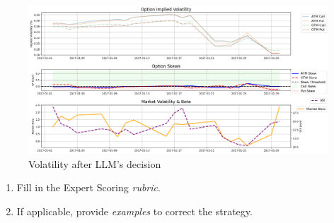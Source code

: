 \documentclass[8pt]{scrartcl}
\begin{document}
\begin{figure}[H]
    \centering
    \includegraphics[width=1\linewidth]{judge_reviews/GOOGL_M_gpt-4o-mini/2017-01-02/llm_Market_Volatility_&_Beta.png}
    \caption{Volatility after LLM's decision}
\end{figure}

\begin{tcolorbox}[colback=blue!10, colframe=blue!60, title=\textbf{TASKS}, sharp corners=southwest]
\begin{enumerate}
    \item Fill in the Expert Scoring \textit{rubric}.
    \item If applicable, provide \textit{examples} to correct the strategy.
\end{enumerate}
\end{tcolorbox}
\newpage
\end{document}
